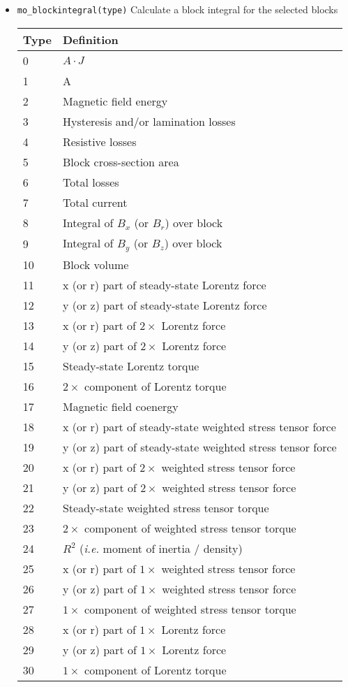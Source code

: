 \begin{itemize}
\item{\tt mo\_blockintegral(type)}
Calculate a block integral for the selected blocks
\begin{center}
\begin{tabular}{ll} \hline
 Type & Definition \\ \hline
 0 & $A \cdot J$ \\
 1 & A \\
 2 & Magnetic field energy \\
 3 & Hysteresis and/or lamination losses \\
 4 & Resistive losses \\
 5 & Block cross-section area \\
 6 & Total losses \\
 7 & Total current \\
 8 & Integral of $B_x$ (or $B_r$) over block \\
 9 & Integral of $B_y$ (or $B_z$) over block \\
 10 & Block volume \\
 11 & x (or r) part of steady-state Lorentz force \\
 12 & y (or z) part of steady-state Lorentz force \\
 13 & x (or r) part of $2\times$ Lorentz force \\
 14 & y (or z) part of $2\times$ Lorentz force \\
 15 & Steady-state Lorentz torque \\
 16 & $2 \times$ component of Lorentz torque \\
 17 & Magnetic field coenergy \\
 18 & x (or r) part of steady-state weighted stress tensor force \\
 19 & y (or z) part of steady-state weighted stress tensor force \\
 20 & x (or r) part of $2\times$ weighted stress tensor force \\
 21 & y (or z) part of $2\times$ weighted stress tensor force \\
 22 & Steady-state weighted stress tensor torque \\
 23 & $2 \times$ component of weighted stress tensor torque \\
 24 & $R^2$ ({\em i.e.} moment of inertia / density) \\ \hline
 25 & x (or r) part of $1\times$ weighted stress tensor force \\
 26 & y (or z) part of $1\times$ weighted stress tensor force \\
 27 & $1 \times$ component of weighted stress tensor torque \\
 28 & x (or r) part of $1\times$ Lorentz force \\
 29 & y (or z) part of $1\times$ Lorentz force \\
 30 & $1 \times$ component of Lorentz torque \\
 

\end{tabular}
\end{center}
\end{itemize}
